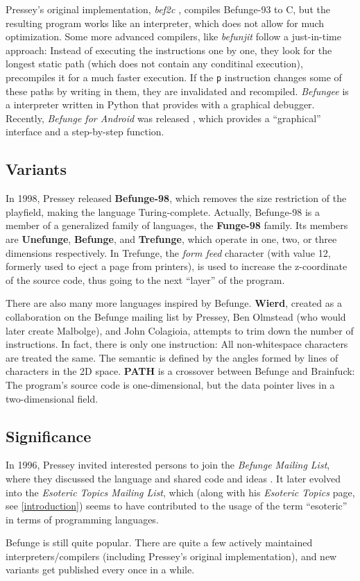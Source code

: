 Pressey's original implementation, \emph{bef2c} \cite{pressey1993befunge}, compiles Befunge-93 to C, but the resulting program works like an interpreter, which does not allow for much optimization. Some more advanced compilers, like \emph{befunjit} \cite{toncean_befunge} follow a just-in-time approach: Instead of executing the instructions one by one, they look for the longest static path (which does not contain any conditinal execution), precompiles it for a much faster execution. If the \texttt{p} instruction changes some of these paths by writing in them, they are invalidated and recompiled. \emph{Befungee} \cite{mcenroe_befunge} is a interpreter written in Python that provides with a graphical debugger. Recently, \emph{Befunge for Android} was released \cite{alexander_befunge}, which provides a “graphical” interface and a step-by-step function.

\subsection{Variants}

In 1998, Pressey released \textbf{Befunge-98}, which removes the size restriction of the playfield, making the language Turing-complete. Actually, Befunge-98 is a member of a generalized family of languages, the \textbf{Funge-98} family. Its members are \textbf{Unefunge}, \textbf{Befunge}, and \textbf{Trefunge}, which operate in one, two, or three dimensions respectively. In Trefunge, the \emph{form feed} character (with \ascii{} value 12, formerly used to eject a page from printers), is used to increase the z-coordinate of the source code, thus going to the next “layer” of the program.

There are also many more languages inspired by Befunge. \textbf{Wierd}, created as a collaboration on the Befunge mailing list by Pressey, Ben Olmstead (who would later create Malbolge), and John Colagioia, attempts to trim down the number of instructions. In fact, there is only one instruction: All non-whitespace characters are treated the same. The semantic is defined by the angles formed by lines of characters in the 2D space. \textbf{PATH} is a crossover between Befunge and Brainfuck: The program's source code is one-dimensional, but the data pointer lives in a two-dimensional field.

\subsection{Significance}

In 1996, Pressey invited interested persons to join the \emph{Befunge Mailing List}, where they discussed the language and shared code and ideas \cite{pressey1996welcome}. It later evolved into the \emph{Esoteric Topics Mailing List}, which (along with his \emph{Esoteric Topics} page, see \cref{introduction}) seems to have contributed to the usage of the term “esoteric” in terms of programming languages.

Befunge is still quite popular. There are quite a few actively maintained interpreters/compilers (including Pressey's original implementation), and new variants get published every once in a while.
